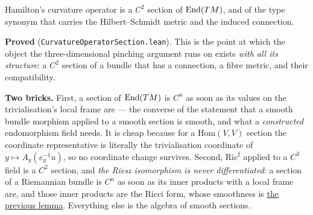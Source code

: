 \begin{lemma}
  \label{lem:curvature-operator-section}
  \leanok
  Hamilton's curvature operator is a $C^2$ section of $\mathrm{End}(TM)$, and of the type
  synonym that carries the Hilbert--Schmidt metric and the induced connection.

  \textbf{Proved} (\texttt{CurvatureOperatorSection.lean}). This is the point at which the
  object the three-dimensional pinching argument runs on exists \emph{with all its
  structure}: a $C^2$ section of a bundle that has a connection, a fibre metric, and their
  compatibility.

  \textbf{Two bricks.} First, a section of $\mathrm{End}(TM)$ is $C^n$ as soon as its values
  on the trivialisation's local frame are --- the converse of the statement that a smooth
  bundle morphism applied to a smooth section is smooth, and what a \emph{constructed}
  endomorphism field needs. It is cheap because for a $\mathrm{Hom}(V,V)$ section the
  coordinate representative is literally the trivialisation coordinate of
  $y \mapsto A_y(e^{-1}_y u)$, so no coordinate change survives. Second, $\mathrm{Ric}^\sharp$
  applied to a $C^3$ field is a $C^2$ section, and \emph{the Riesz isomorphism is never
  differentiated}: a section of a Riemannian bundle is $C^n$ as soon as its inner products
  with a local frame are, and those inner products are the Ricci form, whose smoothness is
  \hyperref[lem:ricci-section]{the previous lemma}. Everything else is the algebra of smooth
  sections.
\end{lemma}

